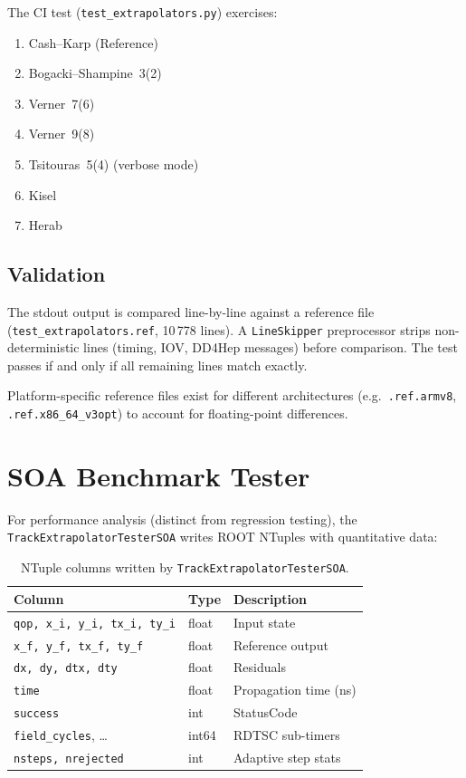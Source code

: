 \documentclass[11pt,a4paper]{article}
\begin{document}
The CI test (\texttt{test\_extrapolators.py}) exercises:
\begin{enumerate}[nosep]
  \item Cash--Karp (Reference)
  \item Bogacki--Shampine~3(2)
  \item Verner~7(6)
  \item Verner~9(8)
  \item Tsitouras~5(4) (verbose mode)
  \item Kisel
  \item Herab
\end{enumerate}

\subsection{Validation}

The stdout output is compared line-by-line against a reference file
(\texttt{test\_extrapolators.ref}, 10\,778 lines).
A \texttt{LineSkipper} preprocessor strips non-deterministic lines
(timing, IOV, DD4Hep messages) before comparison.
The test passes if and only if all remaining lines match exactly.

Platform-specific reference files exist for different architectures
(e.g.\ \texttt{.ref.armv8}, \texttt{.ref.x86\_64\_v3\-opt})
to account for floating-point differences.


\section{SOA Benchmark Tester}\label{sec:soa}

For performance analysis (distinct from regression testing), the
\texttt{TrackExtrapolatorTesterSOA} writes ROOT NTuples with quantitative
data:

\begin{table}[H]
\centering
\caption{NTuple columns written by \texttt{TrackExtrapolatorTesterSOA}.}
\begin{tabular}{@{}p{5cm}ll@{}}
\toprule
\textbf{Column} & \textbf{Type} & \textbf{Description} \\
\midrule
\texttt{qop, x\_i, y\_i, tx\_i, ty\_i}
  & float & Input state \\
\texttt{x\_f, y\_f, tx\_f, ty\_f}
  & float & Reference output \\
\texttt{dx, dy, dtx, dty}
  & float & Residuals \\
\texttt{time}
  & float & Propagation time (ns) \\
\texttt{success}
  & int & StatusCode \\
\texttt{field\_cycles}, \ldots
  & int64 & RDTSC sub-timers \\
\texttt{nsteps, nrejected}
  & int & Adaptive step stats \\
\bottomrule
\end{tabular}
\end{table}
\end{document}
